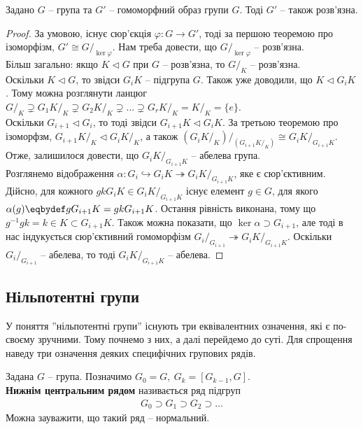 \documentclass{math_library}
\begin{document}
\begin{proposition}
Задано $G$ -- група та $G'$ -- гомоморфний образ групи $G$. Тоді $G'$ -- також розв'язна.
\end{proposition}

\begin{proof}
За умовою, існує сюр'єкція $\varphi \colon G \to G'$, тоді за першою теоремою про ізоморфізм, $G' \cong G/_{\ker \varphi}$. Нам треба довести, що $G/_{\ker \varphi}$ -- розв'язна.\\
Більш загально: якщо $K \triangleleft G$ при $G$ -- розв'язна, то $G/_K$ -- розв'язна.\\
Оскільки $K \triangleleft G$, то звідси $G_i K$ -- підгрупа $G$. Також уже доводили, що $K \triangleleft G_iK$. Тому можна розглянути ланцюг\\
$G/_K \supsetneq G_1 K/_K \supsetneq G_2 K/_K \supsetneq \dots \supsetneq G_r K/_K = K/_K = \{e\}$.\\
Оскільки $G_{i+1} \triangleleft G_i$, то тоді звідси $G_{i+1} K \triangleleft G_{i} K$. За третьою теоремою про ізоморфзм, $G_{i+1}K/_K \triangleleft G_i K/_K$, а також $\left(G_i K/_K \right)/_{\left( G_{i+1}K/_K \right)} \cong G_i K/_{G_{i+1} K}$.\\
Отже, залишилося довести, що $G_i K/_{G_{i+1} K}$ -- абелева група.\\
Розглянемо відображення $\alpha \colon G_i \hookrightarrow G_i K \twoheadrightarrow G_i K/_{G_{i+1} K}$, яке є сюр'єктивним. Дійсно, для кожного $gk G_i K \in G_i K/_{G_{i+1} K}$ існує елемент $g \in G$, для якого $\alpha(g) \eqbydef gG_{i+1}K = gk G_{i+1}K$. Остання рівність виконана, тому що $g^{-1}gk = k \in K \subset G_{i+1}K$. Також можна показати, що $\ker \alpha \supset G_{i+1}$, але тоді в нас індукується сюр'єктивний гомоморфізм $G_i/_{G_{i+1}} \twoheadrightarrow G_iK/_{G_{i+1}K}$. Оскільки $G_i/_{G_{i+1}}$ -- абелева, то тоді $G_i K/_{G_{i+1}K}$ -- абелева.
\end{proof}

\subsection{Нільпотентні групи}
У поняття ''нільпотентні групи'' існують три еквівалентних означення, які є по-своєму зручними. Тому почнемо з них, а далі перейдемо до суті. Для спрощення наведу три означення деяких специфічних групових рядів.

\begin{definition}
Задана $G$ -- група. Позначимо $G_0 = G,\ G_k = [G_{k-1},G]$.\\
\textbf{Нижнім центральним рядом} називається ряд підгруп
\begin{align*}
G_0 \supset G_1 \supset G_2 \supset \dots
\end{align*}
Можна зауважити, що такий ряд -- нормальний.
\end{definition}
\end{document}
